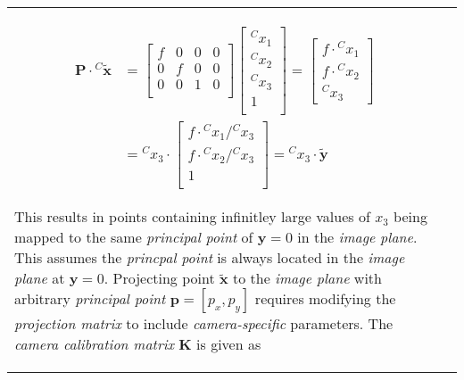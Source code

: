 \documentclass[a4paper,10pt]{article}
\begin{document}
\begin{longtable}{l p{12cm} }
{\begin{itemize}
\begin{itemize}
 
\begin{equation*}
\begin{split}
\mathbf{P}\cdot{^{C}\mathbf{\tilde{x}}}&=
\begin{bmatrix}
f & 0 & 0 & 0\\
0 & f & 0 & 0\\
0 & 0 & 1 & 0\\
\end{bmatrix}\left[\begin{array}{c}{^Cx_1}\\{^Cx_2}\\{^Cx_3}\\1\\\end{array}\right]
=\left[\begin{array}{c}
f\cdot {^Cx_1}\\
f\cdot {^Cx_2}\\
{^Cx_3}
\end{array}\right]\\
&=
{^Cx_3}\cdot\begin{bmatrix}
f\cdot{^Cx_1}/{^Cx_3}\\
f\cdot{^Cx_2}/{^Cx_3}\\
1\\
\end{bmatrix}
={^Cx_3}\cdot\mathbf{\tilde{y}}
\end{split}
\end{equation*} 

This results in points containing infinitley large values of $x_3$ being mapped to the same \textit{principal point} of $\mathbf{y}=0$ in the \textit{image plane}. This assumes the \textit{princpal point} is always located in the \textit{image plane} at $\mathbf{y}=0$. Projecting point $\mathbf{\tilde{x}}$ to the \textit{image plane} with arbitrary \textit{principal point} $\mathbf{p}=[p_x,p_y]$ requires modifying the \textit{projection matrix} to include \textit{camera-specific} parameters. The \textit{camera calibration matrix} $\mathbf{K}$ is given as
 

\end{itemize}
\end{itemize}}
\end{longtable}
\end{document}

